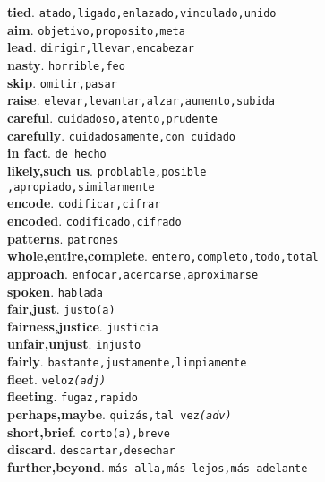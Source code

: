 \documentclass[twocolumn]{article}
\begin{document}
	\textsf{\textbf{tied}}. \texttt{atado,ligado,enlazado,vinculado,unido}\\
	\textsf{\textbf{aim}}. \texttt{objetivo,proposito,meta}\\
	\textsf{\textbf{lead}}. \texttt{dirigir,llevar,encabezar}\\
	\textsf{\textbf{nasty}}. \texttt{horrible,feo}\\
	\textsf{\textbf{skip}}. \texttt{omitir,pasar}\\
	\textsf{\textbf{raise}}. \texttt{elevar,levantar,alzar,aumento,subida}\\
	\textsf{\textbf{careful}}. \texttt{cuidadoso,atento,prudente}\\
	\textsf{\textbf{carefully}}. \texttt{cuidadosamente,con cuidado}\\
	\textsf{\textbf{in fact}}. \texttt{de hecho}\\
	\textsf{\textbf{likely,such us}}. \texttt{problable,posible\\,apropiado,similarmente}\\
	\textsf{\textbf{encode}}. \texttt{codificar,cifrar}\\
	\textsf{\textbf{encoded}}. \texttt{codificado,cifrado}\\
	\textsf{\textbf{patterns}}. \texttt{patrones}\\
	\textsf{\textbf{whole,entire,complete}}. \texttt{entero,completo,todo,total}\\
	\textsf{\textbf{approach}}. \texttt{enfocar,acercarse,aproximarse}\\
	\textsf{\textbf{spoken}}. \texttt{hablada}\\
	\textsf{\textbf{fair,just}}. \texttt{justo(a)}\\
	\textsf{\textbf{fairness,justice}}. \texttt{justicia}\\
	\textsf{\textbf{unfair,unjust}}. \texttt{injusto}\\
	\textsf{\textbf{fairly}}. \texttt{bastante,justamente,limpiamente}\\
	\textsf{\textbf{fleet}}. \texttt{veloz{\scriptsize \textsl{(adj)}}}\\
	\textsf{\textbf{fleeting}}. \texttt{fugaz,rapido}\\
	\textsf{\textbf{perhaps,maybe}}. \texttt{quiz\'as,tal vez{\scriptsize \textsl{(adv)}}}\\
	\textsf{\textbf{short,brief}}. \texttt{corto(a),breve}\\
	\textsf{\textbf{discard}}. \texttt{descartar,desechar}\\
	\textsf{\textbf{further,beyond}}. \texttt{m\'as alla,m\'as lejos,m\'as adelante}\\
\end{document}
